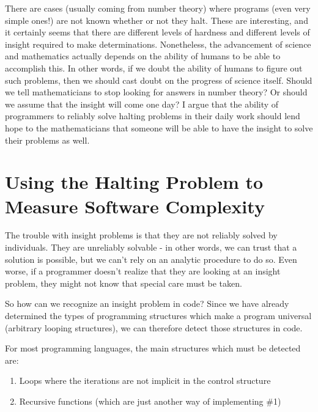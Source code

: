 There are cases (usually coming from number theory) where programs (even very simple ones!) are not known whether or not they halt.  These are interesting, and it certainly seems that there are different levels of hardness and different levels of insight required to make determinations.  Nonetheless, the advancement of science and mathematics actually depends on the ability of humans to be able to accomplish this.  In other words, if we doubt the ability of humans to figure out such problems, then we should cast doubt on the progress of science itself.  Should we tell mathematicians to stop looking for answers in number theory?   Or should we assume that the insight will come one day?  I argue that the ability of programmers to reliably solve halting problems in their daily work should lend hope to the mathematicians that someone will be able to have the insight to solve their problems as well.

\section[Using the Halting Problem]{Using the Halting Problem to Measure Software Complexity}

The trouble with insight problems is that they are not reliably solved by individuals.  They are unreliably solvable - in other words, we can trust that a solution is possible, but we can't rely on an analytic procedure to do so.  Even worse, if a programmer doesn't realize that they are looking at an insight problem, they might not know that special care must be taken.

So how can we recognize an insight problem in code?  Since we have already determined the types of programming structures which make a program universal (arbitrary looping structures), we can therefore detect those structures in code.

For most programming languages, the main structures which must be detected are:

\begin{enumerate}
\item Loops where the iterations are not implicit in the control structure
\item Recursive functions (which are just another way of implementing \#1)
\end{enumerate}

